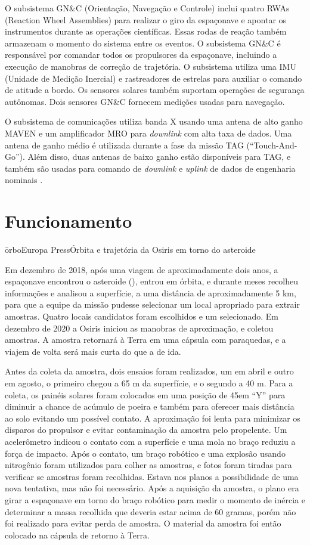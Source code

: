 O subsistema GN\&C (Orientação, Navegação e Controle) inclui quatro RWAs (Reaction Wheel Assemblies) para realizar o giro da espaçonave e apontar os instrumentos durante as operações científicas. Essas rodas de reação também armazenam o momento do sistema entre os eventos. O subsistema GN\&C é responsável por comandar todos os propulsores da espaçonave, incluindo a execução de manobras de correção de trajetória. O subsistema utiliza uma IMU (Unidade de Medição Inercial) e rastreadores de estrelas para auxiliar o comando de atitude a bordo. Os sensores solares também suportam operações de segurança autônomas. Dois sensores GN\&C fornecem medições usadas para navegação.

O subsistema de comunicações utiliza banda X usando uma antena de alto ganho MAVEN e um amplificador MRO para \textit{downlink} com alta taxa de dados. Uma antena de ganho médio é utilizada durante a fase da missão TAG (``Touch-And-Go''). Além disso, duas antenas de baixo ganho estão disponíveis para TAG, e também são usadas para comando de \textit{downlink} e \textit{uplink} de dados de engenharia nominais
\cite{osiris2020}.


\section{Funcionamento}

\f{orbo}{Europa Press}{Órbita e trajetória da Osiris em torno do asteroide}

Em dezembro de 2018, após uma viagem de aproximadamente dois anos, a espaçonave encontrou o asteroide (), entrou em órbita, e durante meses recolheu informações e analisou a superfície, a uma distância de aproximadamente 5 km, para que a equipe da missão pudesse selecionar um local apropriado para extrair amostras. Quatro locais candidatos foram escolhidos e um selecionado. Em dezembro de 2020 a Osiris iniciou as manobras de aproximação, e coletou amostras. A amostra retornará à Terra em uma cápsula com paraquedas, e a viajem de volta será mais curta do que a de ida.

Antes da coleta da amostra, dois ensaios foram realizados, um em abril e outro em agosto, o primeiro chegou a 65 m da superfície, e o segundo a 40 m. Para a coleta, os painéis solares foram colocados em uma posição de 45\g em ``Y'' para diminuir a chance de acúmulo de poeira e também para oferecer mais distância ao solo evitando um possível contato. A aproximação foi lenta para minimizar os disparos do propulsor e evitar contaminação da amostra pelo propelente. Um acelerômetro indicou o contato com a superfície e uma mola no braço reduziu a força de impacto. Após o contato, um braço robótico e uma explosão usando nitrogênio foram utilizados para colher as amostras, e fotos foram tiradas para verificar se amostras foram recolhidas. Estava nos planos a possibilidade de uma nova tentativa, mas não foi necessário. Após a aquisição da amostra, o plano era  girar a espaçonave em torno do braço robótico para medir o momento de inércia e determinar a massa recolhida que deveria estar acima de 60 gramas, porém não foi realizado para evitar perda de amostra. O material da amostra foi então colocado na cápsula de retorno à Terra.

